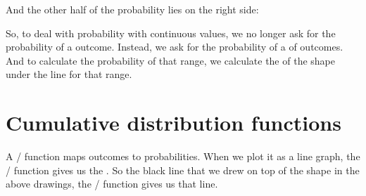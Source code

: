 \documentclass[../../../main.tex]{subfiles}
\begin{document}
\begin{center}
\end{center}

\noindent
And the other half of the probability lies on the right side:

\begin{center}
\end{center}

\noindent
So, to deal with probability with continuous values, we no longer ask for the probability of a  outcome. Instead, we ask for the probability of a  of outcomes. And to calculate the probability of that range, we calculate the  of the shape under the line for that range. 


\section{Cumulative distribution functions}

A \PDFtext/ function maps outcomes to probabilities. When we plot it as a line graph, the \PDFtext/ function gives us the . So the black line that we drew on top of the shape in the above drawings, the \PDFtext/ function gives us that line.
\end{document}
